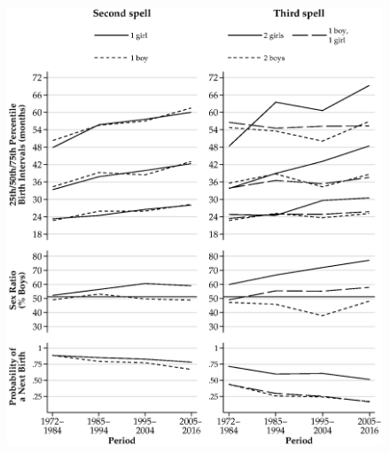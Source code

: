 \documentclass[12pt,letterpaper]{article}
\begin{document}
\begin{figure}
\centering
\includegraphics[width=\textwidth,height=\textheight,keepaspectratio=true]{bs_highest_urban}
\end{figure}
\end{document}
